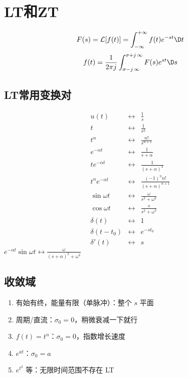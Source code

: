 \section{LT和ZT}

\vspace{-11pt}
\[F(s) = \mathcal L[f(t)] = \int_{-\infty}^{+\infty}f(t)e^{-st}\D t\]
\[f(t) = \frac{1}{2\pi j}\int_{\sigma-j\,\infty}^{\sigma+j
\,\infty} F(s)e^{st}\D s\]

\subsection{LT常用变换对}
\vspace{-7pt}
\[
\begin{array}{lcl}
u(t) & \longleftrightarrow & \frac{1}{s} \\
t & \longleftrightarrow & \frac{1}{s^2} \\
t^n & \longleftrightarrow & \frac{n!}{s^{n+1}} \\
e^{-\alpha t} & \longleftrightarrow & \frac{1}{s+\alpha} \\
te^{-\alpha t} & \longleftrightarrow & \frac{1}{(s+\alpha)^2} \\
t^ne^{-\alpha t} & \longleftrightarrow & \frac{(-1)^nn!}{(s+\alpha)^{n+1}} \\
\sin{\omega t} & \longleftrightarrow & \frac{\omega}{s^2+\omega^2} \\
\cos{\omega t} & \longleftrightarrow & \frac{s}{s^2+\omega^2} \\
\delta(t) & \longleftrightarrow & 1 \\
\delta(t-t_0) & \longleftrightarrow & e^{-st_0} \\
\delta'(t) & \longleftrightarrow & s
\end{array}
\]
\(e^{-\alpha t}\sin{\omega t}  \longleftrightarrow  \frac{\omega}{(s+\alpha)^2+\omega^2}\)

\subsection{收敛域}
\begin{enumerate}
\setlength{\itemsep}{0pt}\setlength{\parskip}{0pt}
\item 有始有终，能量有限（单脉冲）：整个 $s$ 平面
\item 周期/直流：$\sigma_0 = 0$，稍微衰减一下就行
\item $f(t)=t^n$：$\sigma_0 = 0$，指数增长速度
\item $e^{at}$：$\sigma_0 = a$
\item $e^{t^2}$ 等：无限时间范围不存在 LT
\end{enumerate}

